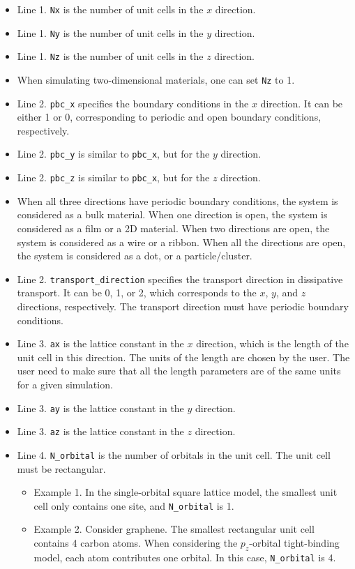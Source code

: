 \documentclass[12pt,a4paper]{report}
\begin{document}
\begin{itemize}
\item Line 1. \verb"Nx" is the number of unit cells in the $x$ direction.
\item Line 1. \verb"Ny" is the number of unit cells in the $y$ direction.
\item Line 1. \verb"Nz" is the number of unit cells in the $z$ direction. 
\item When simulating two-dimensional materials, one can set \verb"Nz" to 1.
\item Line 2. \verb"pbc_x" specifies the boundary conditions in the $x$ direction. It can be either 1 or 0, corresponding to periodic and open boundary conditions, respectively.
\item Line 2. \verb"pbc_y" is similar to \verb"pbc_x", but for the $y$ direction.
\item Line 2. \verb"pbc_z" is similar to \verb"pbc_x", but for the $z$ direction. \item When all three directions have periodic boundary conditions, the system is considered as a bulk material. When one direction is open, the system is considered as a film or a 2D material. When two directions are open, the system is considered as a wire or a ribbon. When all the directions are open, the system is considered as a dot, or a particle/cluster. 
\item Line 2. \verb"transport_direction" specifies the transport direction in dissipative transport. It can be 0, 1, or 2, which corresponds to the $x$, $y$, and $z$ directions, respectively. The transport direction must have periodic boundary conditions.
\item Line 3. \verb"ax" is the lattice constant in the $x$ direction, which is the length of the unit cell in this direction. The units of the length are chosen by the user. The user need to make sure that all the length parameters are of the same units for a given simulation.
\item Line 3. \verb"ay" is the lattice constant in the $y$ direction.
\item Line 3. \verb"az" is the lattice constant in the $z$ direction.
\item Line 4. \verb"N_orbital" is the number of orbitals in the unit cell. The unit cell must be rectangular. 

\begin{itemize}
\item Example 1. In the single-orbital square lattice model, the smallest unit cell only contains one site, and \verb"N_orbital" is 1. 
\item  Example 2. Consider graphene. The smallest rectangular unit cell contains 4 carbon atoms. When considering the $p_z$-orbital tight-binding model, each atom contributes one orbital. In this case, \verb"N_orbital" is 4.
\end{itemize}


\end{itemize}
\end{document}
